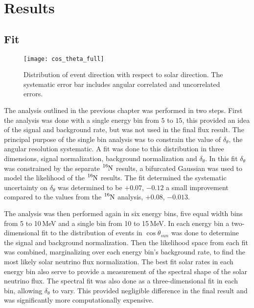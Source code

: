 \chapter{Results}
\label{sec:snopresults}
\section{Fit}
\begin{figure}
  \centering
  \texttt{[image: cos\_theta\_full]}
  \caption[5.0 to 15.0 MeV $\cos\theta_{sun}$ Distribution] {Distribution of event direction
                                              with respect to solar direction.
                                              The systematic error bar includes
                                              angular correlated and
                                              uncorrelated errors.}

  \label{fig:costheta}
\end{figure}
The analysis outlined in the previous chapter was performed in two steps.
First the analysis was done with a single energy bin from $5$ to $15$,
this provided an idea of the signal and background rate, but was not used in
the final flux result.
The principal purpose of the single bin analysis was to constrain the value of
$\delta_{\theta}$, the angular resolution systematic.
A fit was done to this distribution in three dimensions, signal normalization,
background normalization and $\delta_{\theta}$.
In this fit $\delta_{\theta}$ was constrained by the separate $\ce{^{16}N}$ 
results, a bifurcated Gaussian was used to model the likelihood of the
$\ce{^{16}N}$ results.
The fit determined the systematic uncertainty on $\delta_{\theta}$
was determined to be $+0.07$, $-0.12$ a small improvement  compared to the values from the 
$\ce{^{16}N}$ analysis, $+0.08$, $-0.013$.

The analysis was then performed again in six energy bins, five equal width
bins from 5 to 10\,MeV and a single bin from 10 to 15\,MeV.
In each energy bin a two-dimensional fit to the distribution of events in $\cos\theta_{sun}$ was
done to determine the signal and background normalization.
Then the likelihood space from each fit was combined,
marginalizing over each energy bin's background rate,
to find the most likely solar neutrino flux normalization.
The best fit solar rates in each energy bin also serve to provide
a measurement of the spectral shape of the solar neutrino
flux.
The spectral fit was also done as a three-dimensional fit
in each bin, allowing $\delta_{\theta}$ to vary.
This provided negligible difference in the final result
and was significantly more computationally expensive.


